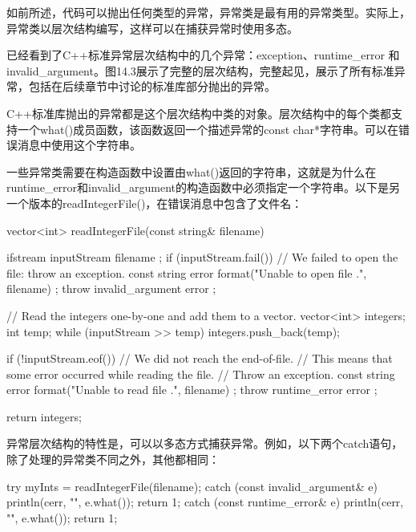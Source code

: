 
如前所述，代码可以抛出任何类型的异常，异常类是最有用的异常类型。实际上，异常类以层次结构编写，这样可以在捕获异常时使用多态。


已经看到了C++标准异常层次结构中的几个异常：exception、runtime\_error 和 invalid\_argument。图14.3展示了完整的层次结构，完整起见，展示了所有标准异常，包括在后续章节中讨论的标准库部分抛出的异常。


C++标准库抛出的异常都是这个层次结构中类的对象。层次结构中的每个类都支持一个what()成员函数，该函数返回一个描述异常的const char*字符串。可以在错误消息中使用这个字符串。

一些异常类需要在构造函数中设置由what()返回的字符串，这就是为什么在runtime\_error和invalid\_argument的构造函数中必须指定一个字符串。以下是另一个版本的readIntegerFile()，在错误消息中包含了文件名：

\begin{cpp}
vector<int> readIntegerFile(const string& filename)
{
    ifstream inputStream { filename };
    if (inputStream.fail()) {
        // We failed to open the file: throw an exception.
        const string error { format("Unable to open file {}.", filename) };
        throw invalid_argument { error };
    }

    // Read the integers one-by-one and add them to a vector.
    vector<int> integers;
    int temp;
    while (inputStream >> temp) {
        integers.push_back(temp);
    }

    if (!inputStream.eof()) {
        // We did not reach the end-of-file.
        // This means that some error occurred while reading the file.
        // Throw an exception.
        const string error { format("Unable to read file {}.", filename) };
        throw runtime_error { error };
    }

    return integers;
}
\end{cpp}


异常层次结构的特性是，可以以多态方式捕获异常。例如，以下两个catch语句，除了处理的异常类不同之外，其他都相同：

\begin{cpp}
try {
    myInts = readIntegerFile(filename);
} catch (const invalid_argument& e) {
    println(cerr, "{}", e.what());
    return 1;
} catch (const runtime_error& e) {
    println(cerr, "{}", e.what());
    return 1;
}
\end{cpp}

